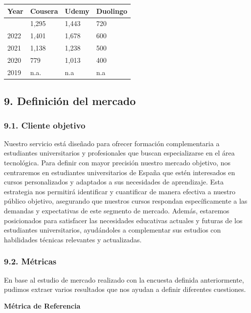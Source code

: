 \documentclass[
]{article}
\begin{document}
\begin{longtable}[]{@{}llll@{}}
\toprule\noalign{}
Year & Cousera & Udemy & Duolingo \\
\midrule\noalign{}
\endhead
\bottomrule\noalign{}
\endlastfoot
2023 & 1,295 & 1,443 & 720 \\
2022 & 1,401 & 1,678 & 600 \\
2021 & 1,138 & 1,238 & 500 \\
2020 & 779 & 1,013 & 400 \\
2019 & n.a. & n.a & n.a \\
\end{longtable}

\newpage

\subsection{9. Definición del mercado}\label{definiciuxf3n-del-mercado}

\subsubsection{9.1. Cliente objetivo}\label{cliente-objetivo}

Nuestro servicio está diseñado para ofrecer formación complementaria a
estudiantes universitarios y profesionales que buscan especializarse en
el área tecnológica. Para definir con mayor precisión nuestro mercado
objetivo, nos centraremos en estudiantes universitarios de España que
estén interesados en cursos personalizados y adaptados a sus necesidades
de aprendizaje. Esta estrategia nos permitirá identificar y cuantificar
de manera efectiva a nuestro público objetivo, asegurando que nuestros
cursos respondan específicamente a las demandas y expectativas de este
segmento de mercado. Además, estaremos posicionados para satisfacer las
necesidades educativas actuales y futuras de los estudiantes
universitarios, ayudándoles a complementar sus estudios con habilidades
técnicas relevantes y actualizadas.

\subsubsection{9.2. Métricas}\label{muxe9tricas}

En base al estudio de mercado realizado con la encuesta definida
anteriormente, pudimos extraer varios resultados que nos ayudan a
definir diferentes cuestiones.

\textbf{Métrica de Referencia}
\end{document}
